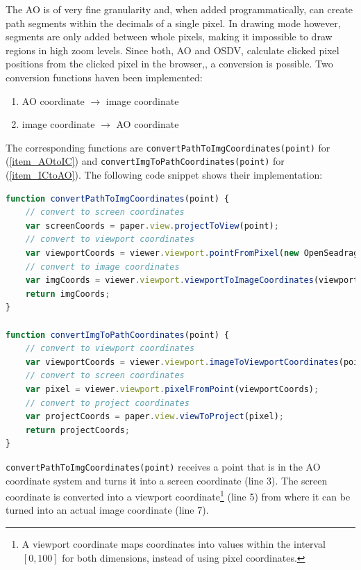 The AO is of very fine granularity and, when added programmatically, can create path segments within the decimals of a single pixel\cite{web:paper}. In drawing mode however, segments are only added between whole pixels, making it impossible to draw regions in high zoom levels. Since both, AO and OSDV, calculate clicked pixel positions from the clicked pixel in the browser\cite{web:openseadragon},\cite{web:paper}, a conversion is possible. Two conversion functions haven been implemented:
\begin{enumerate}[(1)]
	\item\label{item_AOtoIC} AO coordinate $\rightarrow$ image coordinate
	\item\label{item_ICtoAO} image coordinate $\rightarrow$ AO coordinate
\end{enumerate}

The corresponding functions are \texttt{convertPathToImgCoordinates(point)} for (\ref{item_AOtoIC}) and \texttt{convertImgToPathCoordinates(point)} for (\ref{item_ICtoAO}). The following code snippet shows their implementation:\clearpage

\begin{lstlisting}[title=as{\textunderscore}viewer.js, frame=single, language=JavaScript]
function convertPathToImgCoordinates(point) {
	// convert to screen coordinates
	var screenCoords = paper.view.projectToView(point);
	// convert to viewport coordinates
	var viewportCoords = viewer.viewport.pointFromPixel(new OpenSeadragon.Point(screenCoords.x, screenCoords.y));
	// convert to image coordinates
	var imgCoords = viewer.viewport.viewportToImageCoordinates(viewportCoords);
	return imgCoords;
}

function convertImgToPathCoordinates(point) {
	// convert to viewport coordinates
	var viewportCoords = viewer.viewport.imageToViewportCoordinates(point);
	// convert to screen coordinates
	var pixel = viewer.viewport.pixelFromPoint(viewportCoords);
	// convert to project coordinates
	var projectCoords = paper.view.viewToProject(pixel);
	return projectCoords;
}
\end{lstlisting}

\texttt{convertPathToImgCoordinates(point)} receives a point that is in the AO coordinate system and turns it into a screen coordinate (line 3). The screen coordinate is converted into a viewport coordinate\footnote{
	A viewport coordinate maps coordinates into values within the interval $[0, 100]$ for both dimensions, instead of using pixel coordinates\cite{web:openseadragon}.
} (line 5) from where it can be turned into an actual image coordinate (line 7).

